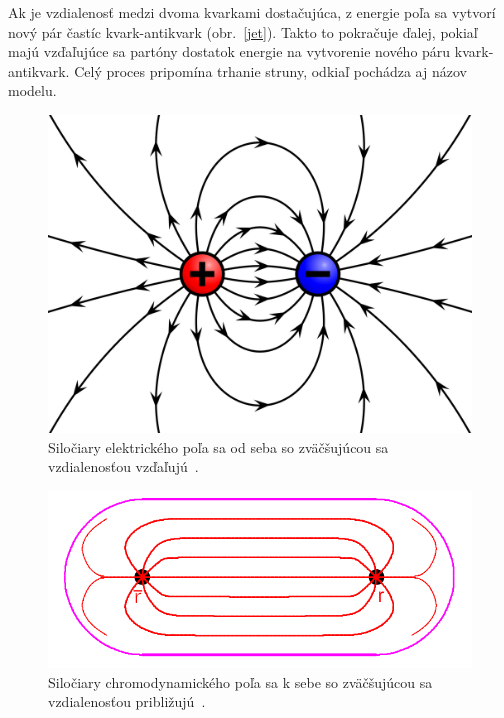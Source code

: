 \documentclass[thesismargins, thesislinespacing]{rnthesis}
\begin{document}
Ak je vzdialenosť medzi dvoma kvarkami dostačujúca, z energie poľa sa vytvorí nový pár častíc kvark-antikvark (obr.~\ref{jet}). Takto to pokračuje ďalej, pokiaľ majú vzďaľujúce sa partóny dostatok energie na vytvorenie nového páru kvark-antikvark. Celý proces pripomína trhanie struny, odkiaľ pochádza aj názov modelu.

\begin{figure}[hbtp!]
	\centering
	\includegraphics[scale=0.06]{./Obrazky_praca/el_pole.png}
	\caption{Siločiary elektrického poľa sa od seba so zväčšujúcou sa vzdialenosťou vzďaľujú~\cite{6}.}
	\label{elpole}
\end{figure}
\begin{figure}[hbtp!]
	\centering
	\includegraphics[scale=0.2]{./Obrazky_praca/chromo_pole.png}
	\caption {Siločiary chromodynamického poľa sa k sebe so zväčšujúcou sa vzdialenosťou približujú~\cite{7}.}
	\label{chrompole}
\end{figure}
\end{document}
